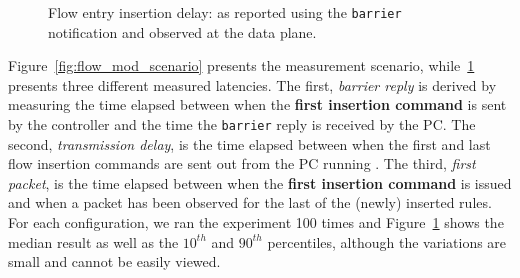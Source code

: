 \begin{figure}[ht]
  \begin{center}
  \end{center}
  \caption[Flow entry insertion delay]{Flow entry insertion delay: as reported using the
    \texttt{barrier} notification and observed at the data
    plane.}
  \label{fig:flow_insertion_comparison}
\end{figure}


Figure~\ref{fig:flow_mod_scenario} presents the measurement scenario,
while~\ref{fig:flow_insertion_comparison} presents three different measured
latencies.  The first, {\it barrier reply} is derived by measuring the
time elapsed between when the \textbf{first insertion command} is sent by the \oflops
controller and the time the \texttt{barrier} reply is received by the
PC\@. The second, {\it transmission delay}, is the time elapsed between when the first and
last flow insertion commands are sent out from the PC running \oflops.  The
third, {\it first packet}, is the time elapsed between when the \textbf{first insertion
  command} is issued and when a packet has been observed for the last of the (newly)
inserted rules. For each configuration, we ran the experiment 100 times and
Figure~\ref{fig:flow_insertion_comparison} shows the median result as well as
the $10^{th}$ and $90^{th}$ percentiles, although the variations are small and
cannot be easily viewed.

